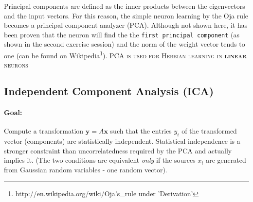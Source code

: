 \documentclass[11pt]{article}
\begin{document}
Principal components are defined as the inner products between the eigenvectors and the input vectors. For this reason, the simple neuron learning by the Oja rule becomes a principal component analyzer (PCA).
Although not shown here, it has been proven that the neuron will find the the \texttt{first principal component} (as shown in the second exercise session) and the norm of the weight vector tends to one (can be found on Wikipedia\footnote{http://en.wikipedia.org/wiki/Oja's\_rule under 'Derivation'}).
\textsc{PCA is used for Hebbian learning in \textbf{linear} neurons}

\subsection{Independent Component Analysis (ICA)}

\paragraph{Goal:} Compute a transformation $\mathbf{y}=A\mathbf{x}$ such that the entries $y_i$ of the transformed vector (components) are statistically independent. Statistical independence is a stronger constraint than uncorrelatedness required by the PCA and actually implies it. (The two conditions are equivalent \textit{only} if the sources $x_i$ are generated from Gaussian random variables - one random vector). 
\end{document}
